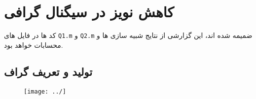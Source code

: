 \section{کاهش نویز در سیگنال گرافی}

کد ها در فایل های \texttt{Q1.m} و \texttt{Q2.m} ضمیمه شده اند، این گزارشی از نتایج شبیه سازی ها و 
محسابات خواهد بود.

\subsection{تولید و تعریف گراف}

\begin{figure}[h]
	\centering
	\texttt{[image: ../]}
\end{figure}